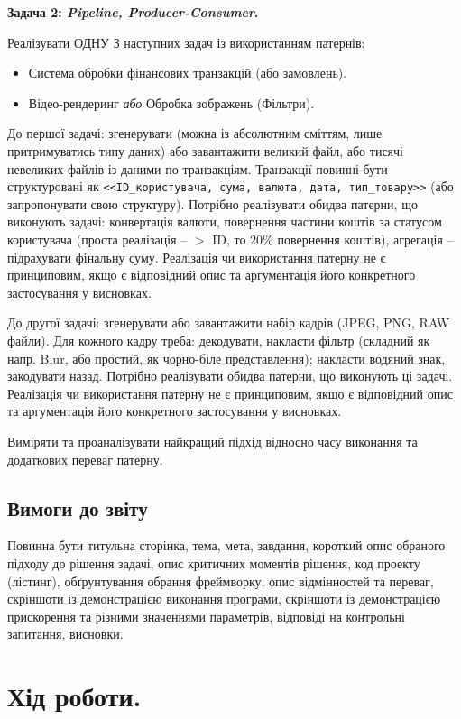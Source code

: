 \documentclass[14pt, a4paper]{extreport}
\begin{document}
	\textbf{Задача 2: \textit{Pipeline, Producer-Consumer}.}
	
	Реалізувати ОДНУ З наступних задач із використанням патернів:
	
	\begin{itemize}
		\item Система обробки фінансових транзакцій (або замовлень).
		\item Відео-рендеринг \textit{або} Обробка зображень (Фільтри).
	\end{itemize}
	
	До першої задачі: згенерувати (можна із абсолютним сміттям, лише притримуватись типу даних) або завантажити великий файл, або тисячі невеликих файлів із даними по транзакціям. Транзакції повинні бути структуровані як \texttt{<<ID\_користувача, сума, валюта, дата, тип\_товару>>} (або запропонувати свою структуру). Потрібно реалізувати обидва патерни, що виконують задачі: конвертація валюти, повернення частини коштів за статусом користувача (проста реалізація -- $>$ ID, то 20\% повернення коштів), агрегація -- підрахувати фінальну суму. Реалізація чи використання патерну не є принциповим, якщо є відповідний опис та аргументація його конкретного застосування у висновках.
	
	До другої задачі: згенерувати або завантажити набір кадрів (JPEG, PNG, RAW файли). Для кожного кадру треба: декодувати, накласти фільтр (складний як напр. Blur, або простий, як чорно-біле представлення); накласти водяний знак, закодувати назад. Потрібно реалізувати
	обидва патерни, що виконують ці задачі. Реалізація чи використання патерну не є принциповим, якщо є відповідний опис та аргументація його конкретного застосування у висновках.
	
	Виміряти та проаналізувати найкращий підхід відносно часу виконання та додаткових переваг патерну.
	
	\subsection*{Вимоги до звіту}
	
	Повинна бути титульна сторінка, тема, мета, завдання, короткий опис обраного підходу до рішення задачі, опис критичних моментів рішення, код проекту (лістинг), обґрунтування обрання фреймворку, опис відмінностей та переваг, скріншоти із демонстрацією виконання програми, скріншоти із демонстрацією прискорення та різними значеннями параметрів, відповіді на контрольні запитання, висновки.
	
	\section*{Хід роботи.}
	
\end{document}
